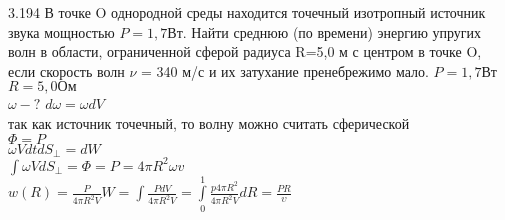 \testCom
{%
	3.194
}
{%
	В точке O однородной среды находится точечный изотропный источник звука мощностью $P = 1,7Вт$. Найти среднюю (по времени) энергию упругих волн в области, ограниченной сферой радиуса R=5,0 м с центром в точке O, если скорость волн $\nu$ = 340 м/с и их затухание пренебрежимо мало.
}
{%
	$P = 1,7Вт$\\
	$R = 5,0 Ом$\\
}
{%
	$\omega - ?$
}
{%
	$d \omega = \omega dV$\\
	так как источник точечный, то волну можно считать сферической\\
	$\Phi = P$\\
	$\omega V dt d{S}_{\perp} = dW$\\
	$\int \omega V d{S}_{\perp} =  \Phi = P = 4 \pi R^2 \omega v$\\
	$w(R) = \frac{P}{4 \pi R^2 V} W= \int \frac{PdV}{4\pi R^2 V} = \int\limits_0^1 \frac{p 4 \pi R^2}{4 \pi R^2 V}dR=\frac{PR}{\upsilon} $\\
}

